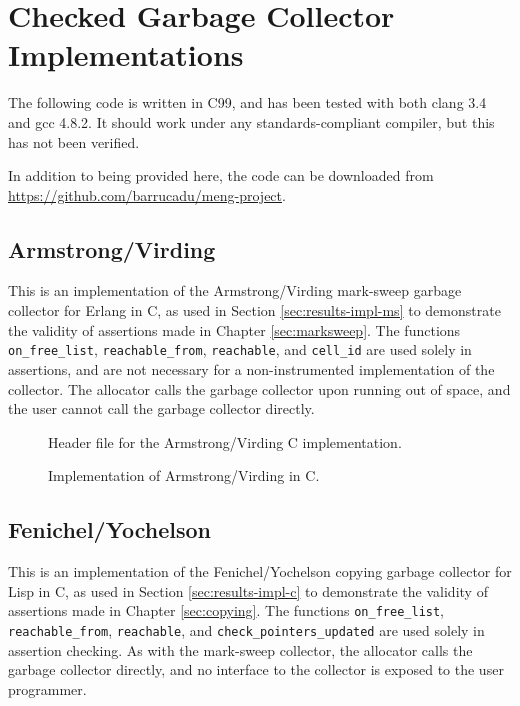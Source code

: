 \chapter{Checked Garbage Collector Implementations}
\label{sec:gc-impl}

\lstset{language=C}

The following code is written in C99, and has been tested with both
clang 3.4 and gcc 4.8.2. It should work under any standards-compliant
compiler, but this has not been verified.

In addition to being provided here, the code can be downloaded from
\url{https://github.com/barrucadu/meng-project}.

\section{Armstrong/Virding}
\label{sec:gc-impl-armstrong-virding}

This is an implementation of the Armstrong/Virding\cite{Armstrong95}
mark-sweep garbage collector for Erlang in C, as used in Section
\ref{sec:results-impl-ms} to demonstrate the validity of assertions
made in Chapter \ref{sec:marksweep}. The functions
\texttt{on\_free\_list}, \texttt{reachable\_from}, \texttt{reachable},
and \texttt{cell\_id} are used solely in assertions, and are not
necessary for a non-instrumented implementation of the collector. The
allocator calls the garbage collector upon running out of space, and
the user cannot call the garbage collector directly.


\begin{figure}[H]
  \captionsetup{format=default}
  \caption{Header file for the Armstrong/Virding C implementation.}
  \label{fig:armstrong-virding-h}
\end{figure}


\begin{figure}[H]
  \captionsetup{format=default}
  \caption{Implementation of Armstrong/Virding in C.}
  \label{fig:armstrong-virding-c}
\end{figure}

\section{Fenichel/Yochelson}
\label{sec:gc-impl-fenichel-yochelson}

This is an implementation of the Fenichel/Yochelson\cite{Fenichel69}
copying garbage collector for Lisp in C, as used in Section
\ref{sec:results-impl-c} to demonstrate the validity of assertions
made in Chapter \ref{sec:copying}. The functions
\texttt{on\_free\_list}, \texttt{reachable\_from}, \texttt{reachable},
and \texttt{check\_pointers\_updated} are used solely in assertion
checking. As with the mark-sweep collector, the allocator calls the
garbage collector directly, and no interface to the collector is
exposed to the user programmer.

